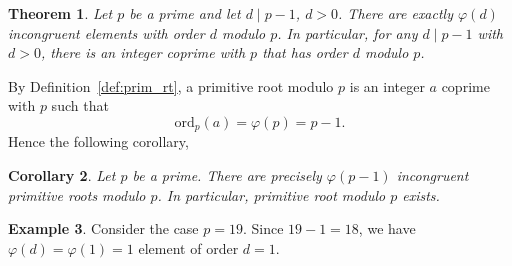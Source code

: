 \documentclass{amsbook}
\theoremstyle{plain}
\newtheorem{theorem}{Theorem}[chapter] %
\newtheorem{corollary}[theorem]{Corollary}
\theoremstyle{definition}
\newtheorem{example}[theorem]{Example}
\theoremstyle{remark}
\numberwithin{equation}{chapter}
\numberwithin{figure}{chapter}
\newcommand*{\ord}{\text{ord}}
\begin{document}
\begin{theorem}\label{thm:ord_div_p-1}
  Let $p$ be a prime and let $d \mid p - 1$, $d > 0$. There are exactly $\varphi (d)$ incongruent elements with order $d$ modulo $p$. In particular, for any $d \mid p-1$ with $d > 0$, there is an integer coprime with $p$ that has order $d$ modulo $p$. 
\end{theorem}
By Definition~\ref{def:prim_rt}, a primitive root modulo $p$ is an integer $a$ coprime with $p$ such that
\[
  \ord_p (a) = \varphi (p) = p - 1.
\]
Hence the following corollary,
\begin{corollary}\label{cor:prim_rt_exists_mod_p}
  Let $p$ be a prime. There are precisely $\varphi (p-1)$ incongruent primitive roots modulo $p$. In particular, primitive root modulo $p$ exists.
\end{corollary}
\begin{example}
 Consider the case $p = 19$. Since $19 - 1 = 18$, we have $\varphi (d) = \varphi (1) = 1$ element of order $d = 1$.
\end{example}
\end{document}
